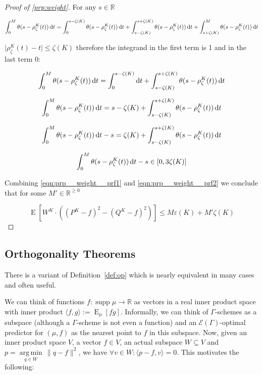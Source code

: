 \documentclass{article}
\numberwithin{equation}{section}
\theoremstyle{definition}
\theoremstyle{plain}
\DeclareMathOperator{\Supp}{supp}
\DeclareMathOperator{\E}{E}
\newcommand{\Argmin}[1]{\underset{#1}{\operatorname{arg\,min}}\,}
\newcommand{\Reals}{\mathbb{R}}
\newcommand{\Abs}[1]{\lvert #1 \rvert}
\newcommand{\Norm}[1]{\lVert #1 \rVert}
\newcommand{\Chev}[1]{\langle #1 \rangle}
\newcommand{\Fall}{\mathcal{E}}
\newcommand{\EG}{\Fall(\Gamma)}
\begin{document}
\begin{proof}[Proof of \ref{prp:weight}]
For any $s \in \Reals$

$$\int_0^M \theta(s-\rho_\zeta^{K}(t)) \dif t = \int_0^{s-\zeta(K)} \theta(s-\rho_\zeta^{K}(t)) \dif t + \int_{s-\zeta(K)}^{s+\zeta(K)} \theta(s-\rho_\zeta^{K}(t)) \dif t + \int_{s+\zeta(K)}^M \theta(s-\rho_\zeta^{K}(t)) \dif t$$

$\Abs{\rho_\zeta^{K}(t)-t} \leq \zeta(K)$ therefore the integrand in the first term is 1 and in the last term 0:

$$\int_0^M \theta(s-\rho_\zeta^{K}(t)) \dif t = \int_0^{s-\zeta(K)} \dif t + \int_{s-\zeta(K)}^{s+\zeta(K)} \theta(s-\rho_\zeta^{K}(t)) \dif t$$

$$\int_0^M \theta(s-\rho_\zeta^{K}(t)) \dif t = s-\zeta(K) + \int_{s-\zeta(K)}^{s+\zeta(K)} \theta(s-\rho_\zeta^{K}(t)) \dif t$$

$$\int_0^M \theta(s-\rho_\zeta^{K}(t)) \dif t - s = \zeta(K) + \int_{s-\zeta(K)}^{s+\zeta(K)} \theta(s-\rho_\zeta^{K}(t)) \dif t$$

\begin{equation}
\label{eqn:prp__weight__prf2}
\int_0^M \theta(s-\rho_\zeta^{K}(t)) \dif t - s \in [0,3\zeta(K)]
\end{equation}

Combining \ref{eqn:prp__weight__prf1} and \ref{eqn:prp__weight__prf2} we conclude that for some $M' \in \Reals^{\geq 0}$

$$\E[W^{K} \cdot ((P^{K}-f)^2-(Q^{K}-f)^2)] \leq M \varepsilon(K) + M'\zeta(K)$$
\end{proof}

\subsection{Orthogonality Theorems}

There is a variant of Definition~\ref{def:op} which is nearly equivalent in many cases and often useful.

We can think of functions $f: \Supp \mu \rightarrow \Reals$ as vectors in a real inner product space with inner product $\Chev{f,g}:=\E_\mu[fg]$. Informally, we can think of $\Gamma$-schemes as a subspace (although a $\Gamma$-scheme is not even a function) and an $\EG$-optimal predictor for $(\mu,f)$ as the nearest point to $f$ in this subspace. Now, given an inner product space $V$, a vector $f \in V$, an actual subspace $W \subseteq V$ and $p = \Argmin{q \in W} \Norm{q - f}^2$, we have $\forall v \in W: \Chev{p-f,v}=0$. This motivates the following:
\end{document}
